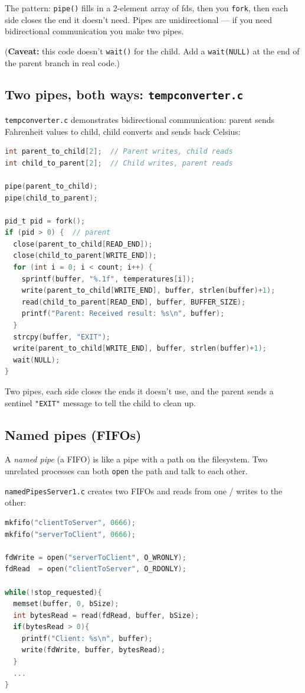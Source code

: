 \documentclass[11pt]{article}
\begin{document}
The pattern: \texttt{pipe()} fills in a 2-element array of fds,
then you \texttt{fork}, then each side closes the end it doesn't
need. Pipes are unidirectional --- if you need bidirectional
communication you make two pipes.

(\textbf{Caveat:} this code doesn't \texttt{wait()} for the
child. Add a \texttt{wait(NULL)} at the end of the parent branch in
real code.)

\subsection*{Two pipes, both ways: \texttt{tempconverter.c}}

\texttt{tempconverter.c} demonstrates bidirectional communication:
parent sends Fahrenheit values to child, child converts and sends
back Celsius:

\begin{lstlisting}[language=C]
int parent_to_child[2];  // Parent writes, child reads
int child_to_parent[2];  // Child writes, parent reads

pipe(parent_to_child);
pipe(child_to_parent);

pid_t pid = fork();
if (pid > 0) {  // parent
  close(parent_to_child[READ_END]);
  close(child_to_parent[WRITE_END]);
  for (int i = 0; i < count; i++) {
    sprintf(buffer, "%.1f", temperatures[i]);
    write(parent_to_child[WRITE_END], buffer, strlen(buffer)+1);
    read(child_to_parent[READ_END], buffer, BUFFER_SIZE);
    printf("Parent: Received result: %s\n", buffer);
  }
  strcpy(buffer, "EXIT");
  write(parent_to_child[WRITE_END], buffer, strlen(buffer)+1);
  wait(NULL);
}
\end{lstlisting}

Two pipes, each side closes the ends it doesn't use, and the
parent sends a sentinel \texttt{"EXIT"} message to tell the child
to clean up.

\subsection*{Named pipes (FIFOs)}

A \emph{named pipe} (a FIFO) is like a pipe with a path on the
filesystem. Two unrelated processes can both \texttt{open} the path
and talk to each other.

\texttt{namedPipesServer1.c} creates two FIFOs and reads from one /
writes to the other:

\begin{lstlisting}[language=C]
mkfifo("clientToServer", 0666);
mkfifo("serverToClient", 0666);

fdWrite = open("serverToClient", O_WRONLY);
fdRead  = open("clientToServer", O_RDONLY);

while(!stop_requested){
  memset(buffer, 0, bSize);
  int bytesRead = read(fdRead, buffer, bSize);
  if(bytesRead > 0){
    printf("Client: %s\n", buffer);
    write(fdWrite, buffer, bytesRead);
  }
  ...
}
\end{lstlisting}
\end{document}
